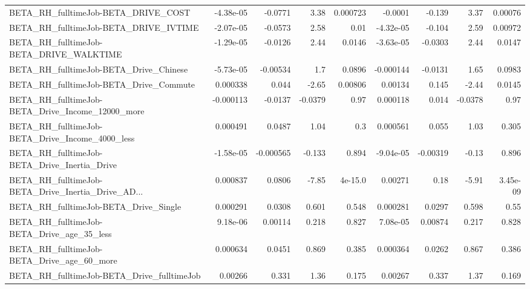 \begin{tabular}{lrrrrrrrr}
BETA\_RH\_fulltimeJob-BETA\_DRIVE\_COST                &   -4.38e-05 &      -0.0771 &     3.38 & 0.000723 &    -0.0001 &      -0.139 &         3.37 &       0.00076 \\
BETA\_RH\_fulltimeJob-BETA\_DRIVE\_IVTIME              &   -2.07e-05 &      -0.0573 &     2.58 &     0.01 &  -4.32e-05 &      -0.104 &         2.59 &       0.00972 \\
BETA\_RH\_fulltimeJob-BETA\_DRIVE\_WALKTIME            &   -1.29e-05 &      -0.0126 &     2.44 &   0.0146 &  -3.63e-05 &     -0.0303 &         2.44 &        0.0147 \\
BETA\_RH\_fulltimeJob-BETA\_Drive\_Chinese             &   -5.73e-05 &     -0.00534 &      1.7 &   0.0896 &  -0.000144 &     -0.0131 &         1.65 &        0.0983 \\
BETA\_RH\_fulltimeJob-BETA\_Drive\_Commute             &    0.000338 &        0.044 &    -2.65 &  0.00806 &    0.00134 &       0.145 &        -2.44 &        0.0145 \\
BETA\_RH\_fulltimeJob-BETA\_Drive\_Income\_12000\_more   &   -0.000113 &      -0.0137 &  -0.0379 &     0.97 &   0.000118 &       0.014 &      -0.0378 &          0.97 \\
BETA\_RH\_fulltimeJob-BETA\_Drive\_Income\_4000\_less    &    0.000491 &       0.0487 &     1.04 &      0.3 &   0.000561 &       0.055 &         1.03 &         0.305 \\
BETA\_RH\_fulltimeJob-BETA\_Drive\_Inertia\_Drive       &   -1.58e-05 &    -0.000565 &   -0.133 &    0.894 &  -9.04e-05 &    -0.00319 &        -0.13 &         0.896 \\
BETA\_RH\_fulltimeJob-BETA\_Drive\_Inertia\_Drive\_AD... &    0.000837 &       0.0806 &    -7.85 &  4e-15.0 &    0.00271 &        0.18 &        -5.91 &      3.45e-09 \\
BETA\_RH\_fulltimeJob-BETA\_Drive\_Single              &    0.000291 &       0.0308 &    0.601 &    0.548 &   0.000281 &      0.0297 &        0.598 &          0.55 \\
BETA\_RH\_fulltimeJob-BETA\_Drive\_age\_35\_less         &    9.18e-06 &      0.00114 &    0.218 &    0.827 &   7.08e-05 &     0.00874 &        0.217 &         0.828 \\
BETA\_RH\_fulltimeJob-BETA\_Drive\_age\_60\_more         &    0.000634 &       0.0451 &    0.869 &    0.385 &   0.000364 &      0.0262 &        0.867 &         0.386 \\
BETA\_RH\_fulltimeJob-BETA\_Drive\_fulltimeJob         &     0.00266 &        0.331 &     1.36 &    0.175 &    0.00267 &       0.337 &         1.37 &         0.169 \\

\end{tabular}
